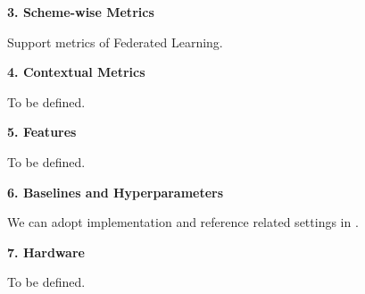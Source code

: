 \noindent
\textbf{3. Scheme-wise Metrics}

Support metrics of Federated Learning. 


\noindent
\textbf{4. Contextual Metrics}

To be defined. 

\noindent
\textbf{5. Features}

To be defined. 

\noindent
\textbf{6. Baselines and Hyperparameters}

We can adopt implementation and reference related settings in \cite{zhuang2020fedreid, zhuang2021easyfl}.

\noindent
\textbf{7. Hardware}

To be defined.
 

